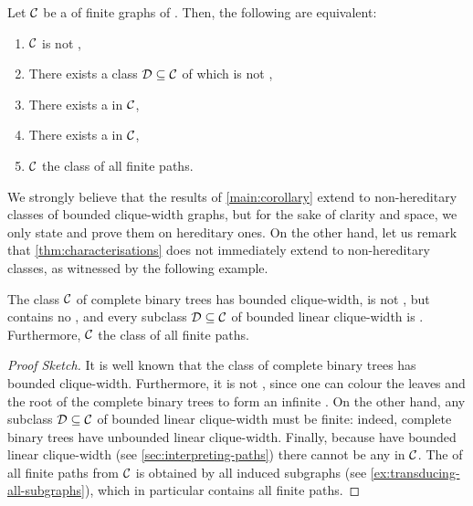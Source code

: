 \begin{theorem}[name={},restate=thm:characterisations]
  \label{thm:characterisations}
  Let $\Cls$ be a  of finite graphs of .
  Then, the following are equivalent:
  \begin{enumerate}
    \item \label{item:charac:not-2wqo}
      $\Cls$ is not ,
    \item \label{item:charac:bounded-lin-cw}
      There exists a class $\Cls[D] \subseteq \Cls$
      of  which is not 
      ,
    \item \label{item:charac:regular-antichain}
      There exists a  in $\Cls$,
    \item \label{item:charac:periodic-antichain}
      There exists a  in $\Cls$,
    \item \label{item:charac:transduces-paths}
      $\Cls$  the class of all finite paths.
  \end{enumerate}
\end{theorem}


We strongly believe that the results of \cref{main:corollary} extend to
non-hereditary classes of bounded clique-width graphs, but for the sake of
clarity and space, we only state and prove them on hereditary ones. On the
other hand, let us remark that \cref{thm:characterisations} does not
immediately extend to non-hereditary classes, as witnessed by the following
example.

\begin{example}
  \label{ex:non-hereditary}
  The class $\Cls$ of complete binary trees has bounded clique-width, is not ,
  but contains no , 
  and every subclass $\Cls[D] \subseteq \Cls$ of bounded linear clique-width
  is .
  Furthermore, $\Cls$  the class of all finite paths.
\end{example}
\begin{proof}[Proof Sketch]
  It is well known that the class of complete binary trees has
  bounded clique-width. Furthermore, it is not ,
  since one can colour the leaves and the root of the complete binary trees
  to form an infinite .
  On the other hand, any subclass $\Cls[D] \subseteq \Cls$ of bounded linear
  clique-width must be finite: indeed, complete binary trees have unbounded
  linear clique-width. Finally, because  have 
  bounded linear clique-width (see \cref{sec:interpreting-paths})
  there cannot be any  in $\Cls$.
  The  of all finite paths from $\Cls$ is obtained
  by  all induced subgraphs (see \cref{ex:transducing-all-subgraphs}), 
  which in particular contains all finite paths. 
\end{proof}




